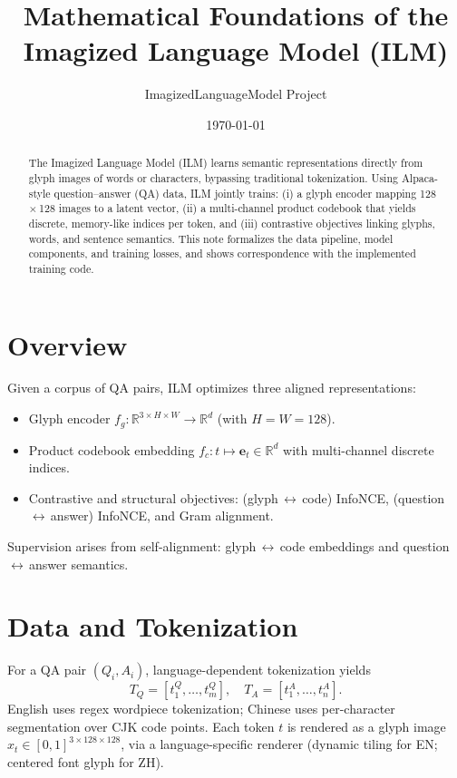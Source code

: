 \documentclass[11pt]{article}
\title{Mathematical Foundations of the Imagized Language Model (ILM)}
\author{ImagizedLanguageModel Project}
\date{\today}
\begin{document}
\maketitle

\begin{abstract}
The Imagized Language Model (ILM) learns semantic representations directly from glyph images of words or characters, bypassing traditional tokenization. Using Alpaca-style question--answer (QA) data, ILM jointly trains: (i) a glyph encoder mapping 128\,\(\times\)\,128 images to a latent vector, (ii) a multi-channel product codebook that yields discrete, memory-like indices per token, and (iii) contrastive objectives linking glyphs, words, and sentence semantics. This note formalizes the data pipeline, model components, and training losses, and shows correspondence with the implemented training code.
\end{abstract}

\section{Overview}
Given a corpus of QA pairs, ILM optimizes three aligned representations:
\begin{itemize}
  \item Glyph encoder \( f_g : \mathbb{R}^{3\times H\times W} \to \mathbb{R}^d \) (with \(H=W=128\)).
  \item Product codebook embedding \( f_c : t \mapsto \mathbf{e}_t \in \mathbb{R}^d \) with multi-channel discrete indices.
  \item Contrastive and structural objectives: (glyph\,\(\leftrightarrow\)\,code) InfoNCE, (question\,\(\leftrightarrow\)\,answer) InfoNCE, and Gram alignment.
\end{itemize}

Supervision arises from self-alignment: glyph\,\(\leftrightarrow\)\,code embeddings and question\,\(\leftrightarrow\)\,answer semantics.

\section{Data and Tokenization}
For a QA pair \((Q_i, A_i)\), language-dependent tokenization yields
\[
  T_Q = [t_1^Q,\ldots,t_m^Q],\quad T_A = [t_1^A,\ldots,t_n^A].
\]
English uses regex wordpiece tokenization; Chinese uses per-character segmentation over CJK code points. Each token \(t\) is rendered as a glyph image \(x_t \in [0,1]^{3\times 128\times 128}\), via a language-specific renderer (dynamic tiling for EN; centered font glyph for ZH).
\end{document}
